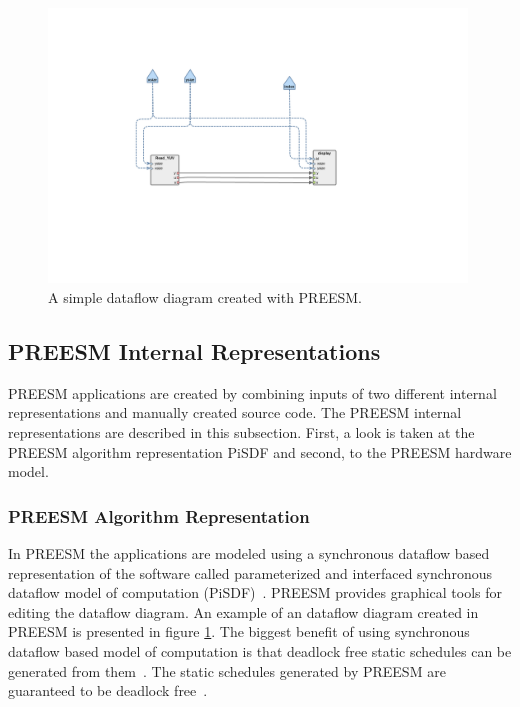 \begin{figure}[h!]
    \begin{center}
        \includegraphics[width=0.99\textwidth]{images/example_preesm_diagram.png}
        \caption{A simple dataflow diagram created with PREESM.}
        \label{fig:preesm_example}
    \end{center}
\end{figure}

\subsection{PREESM Internal Representations}
\label{subsec:preesm-internal}
PREESM applications are created by combining inputs of two different internal representations and manually created source code. The PREESM internal representations are described in this subsection. First, a look is taken at the PREESM algorithm representation PiSDF and second, to the PREESM hardware model.

\subsubsection{PREESM Algorithm Representation}
\label{subsubsec:preesm-algorithm}
In PREESM the applications are modeled using a synchronous dataflow based representation of the software called parameterized and interfaced synchronous dataflow model of computation (PiSDF)~\cite{pelcat2014preesm}. PREESM provides graphical tools for editing the dataflow diagram. An example of an dataflow diagram created in PREESM is presented in figure \ref{fig:preesm_example}. The biggest benefit of using synchronous dataflow based model of computation is that deadlock free static schedules can be generated from them~\cite{pelcat2014preesm}. The static schedules generated by PREESM are guaranteed to be deadlock free~\cite{preesm}.

